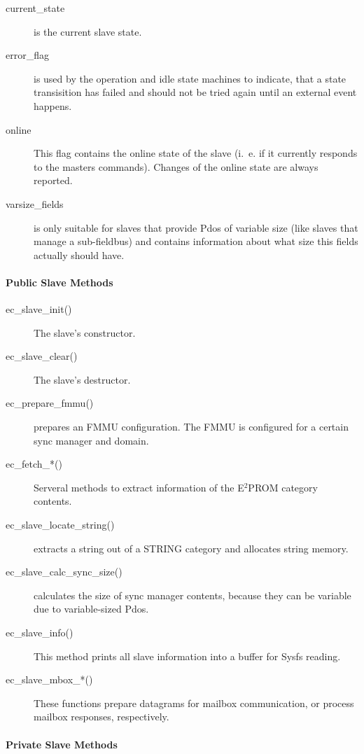 \documentclass[a4paper,12pt,BCOR6mm,bibtotoc,idxtotoc]{scrbook}
\begin{document}
\begin{description}
\item[current\_state] is the current slave state.
\item[error\_flag] is used by the operation and idle state machines
  to indicate, that a state transisition has failed and should not be
  tried again until an external event happens.
\item[online] This flag contains the online state of the slave (i.~e.
  if it currently responds to the masters commands). Changes of the
  online state are always reported.
\item[varsize\_fields] is only suitable for slaves that provide Pdos
  of variable size (like slaves that manage a sub-fieldbus) and
  contains information about what size this fields actually should
  have.
\end{description}

\paragraph{Public Slave Methods}

\begin{description}
\item[ec\_slave\_init()] The slave's constructor.
\item[ec\_slave\_clear()] The slave's destructor.
\item[ec\_prepare\_fmmu()] prepares an FMMU configuration. The FMMU is
  configured for a certain sync manager and domain.
\item[ec\_fetch\_*()] Serveral methods to extract information of the
  E$^2$PROM category contents.
\item[ec\_slave\_locate\_string()] extracts a string out of a STRING
  category and allocates string memory.
\item[ec\_slave\_calc\_sync\_size()] calculates the size of sync
  manager contents, because they can be variable due to variable-sized
  Pdos.
\item[ec\_slave\_info()] This method prints all slave information into
  a buffer for Sysfs reading.
\item[ec\_slave\_mbox\_*()] These functions prepare datagrams for
  mailbox communication, or process mailbox responses, respectively.
\end{description}

\paragraph{Private Slave Methods}
\end{document}
